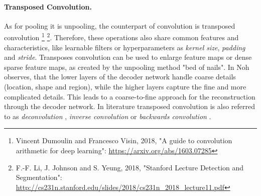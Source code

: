 
\paragraph{Transposed Convolution.}
As for pooling it is unpooling, the counterpart of convolution is transposed convolution
\footnote{Vincent Dumoulin and Francesco Visin, 2018, "A guide to convolution arithmetic for deep learning": \url{https://arxiv.org/abs/1603.07285}}
\footnote{F.-F. Li, J. Johnson and S. Yeung, 2018, "Stanford Lecture Detection and Segmentation": \url{http://cs231n.stanford.edu/slides/2018/cs231n_2018_lecture11.pdf}\label{fn:LJY10_StanfordLecture}}.
Therefore, these operations also share common features and characteristics, like learnable filters or hyperparameters as \textit{kernel size}, \textit{padding} and \textit{stride}.
Transposes convolution can be used to enlarge feature maps or dense sparse feature maps, as created by the unpooling method "bed of nails".
In \cite{NHH15-DeConvNet} Noh observes, that the lower layers of the decoder network handle coarse details (\eg location, shape and region), while the higher layers capture the fine and more complicated details.
This leads to a coarse-to-fine approach for the reconstruction through the decoder network.
In literature transposed convolution is also referred to as  \textit{deconvolution} \cite{NHH15-DeConvNet}, \textit{inverse convolution} \cite{Bad17-SegNet} or \textit{backwards convolution} \cite{LSD15-FCN}.

